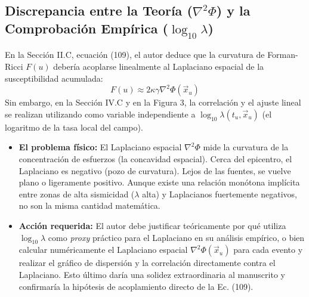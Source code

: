 \documentclass[11pt]{article}
\begin{document}
\subsection{Discrepancia entre la Teoría ($\nabla^2 \Phi$) y la Comprobación Empírica ($\log_{10} \lambda$)}
En la Sección II.C, ecuación (109), el autor deduce que la curvatura de Forman-Ricci $F(u)$ debería acoplarse linealmente al Laplaciano espacial de la susceptibilidad acumulada:
\begin{equation}
F(u) \approx 2 \kappa \gamma \nabla^2 \Phi(\vec{x}_u)
\end{equation}
Sin embargo, en la Sección IV.C y en la Figura 3, la correlación y el ajuste lineal se realizan utilizando como variable independiente a $\log_{10} \lambda(t_u, \vec{x}_u)$ (el logaritmo de la tasa local del campo).
\begin{itemize}
    \item \textbf{El problema físico:} El Laplaciano espacial $\nabla^2 \Phi$ mide la curvatura de la concentración de esfuerzos (la concavidad espacial). Cerca del epicentro, el Laplaciano es negativo (pozo de curvatura). Lejos de las fuentes, se vuelve plano o ligeramente positivo. Aunque existe una relación monótona implícita entre zonas de alta sismicidad ($\lambda$ alta) y Laplacianos fuertemente negativos, no son la misma cantidad matemática.
    \item \textbf{Acción requerida:} El autor debe justificar teóricamente por qué utiliza $\log_{10} \lambda$ como \textit{proxy} práctico para el Laplaciano en su análisis empírico, o bien calcular numéricamente el Laplaciano espacial $\nabla^2 \Phi(\vec{x}_u)$ para cada evento y realizar el gráfico de dispersión y la correlación directamente contra el Laplaciano. Esto último daría una solidez extraordinaria al manuscrito y confirmaría la hipótesis de acoplamiento directo de la Ec. (109).
\end{itemize}
\end{document}
